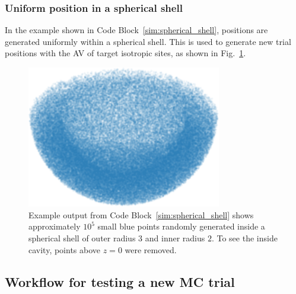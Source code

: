 \documentclass[
  9pt,
  bestpractices,
  pubversion,
]{livecoms}
\begin{document}
\subsubsection{\label{sec:spherical_shell}Uniform position in a spherical shell}

In the example shown in Code Block~\ref{sim:spherical_shell}, positions are generated uniformly within a spherical shell.
This is used to generate new trial positions with the AV of target isotropic sites, as shown in Fig.~\ref{fig:spherical_shell}.

\begin{figure}

\end{figure}

\begin{figure}
\begin{centering}
\includegraphics[width=8.5cm]{../figures/spherical_shell.png}
\caption{
Example output from Code Block~\ref{sim:spherical_shell} shows approximately $10^5$ small blue points randomly generated inside a spherical shell of outer radius $3$ and inner radius $2$.
To see the inside cavity, points above $z=0$ were removed.
\label{fig:spherical_shell}
}
\end{centering}
\end{figure}

\subsection{\label{sec:testingnewtrial}Workflow for testing a new MC trial}
\end{document}
